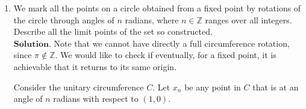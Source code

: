 \documentclass{article}
\theoremstyle{remark}
\begin{document}
\begin{enumerate}
        To find the magnitude of the absolute error, since $x_n - \sqrt{a} = \Delta_n$, then 
        $x_n = \Delta_n + \sqrt{a}$.
        This implies that 
        \[
        x_{n+1} = \Delta_{n+1} + \sqrt{a}= \frac{1}{2}\left((\Delta_n + \sqrt{a}) + \frac{a}{\Delta_n + \sqrt{a}}\right)
        \]
        thus 
        \[
        \Delta_{n+1} = \frac{1}{2}\left((\Delta_n + \sqrt{a}) + \frac{a}{\Delta_n + \sqrt{a}}\right) - \sqrt{a}
        \]
        operating the right hand side, we get
        \[
        \Delta_{n+1} = \frac{1}{2}\left(\frac{\Delta_n^2 + 2\Delta_n\sqrt{a} + 2a}{\Delta_n + \sqrt{a}}\right) - \sqrt{a}
        \]
        therefore 
        \[
        \Delta_{n+1} = \frac{\Delta_n^2 + 2\Delta_n\sqrt{a} + 2a-2\sqrt{a}\Delta_n-2a}{2(\Delta_n + \sqrt{a})} = \frac{\Delta_n^2}{2(\Delta_n + \sqrt{a})}
        \]
        we conclude that 
        \[
        \Delta_{n+1} = \frac{\Delta_n^2}{2x_n}.  
        \]
        This implies that the error for any subsequent term is quadratic, 
        although, since $x_n$ converges to $\sqrt{a}$, $(x_n - \sqrt{a})^2 < 1$ for some $n \geq N'$, 
        and from there on, the error will decrease ``faster''. %
        \begin{flushright}
            \qed
        \end{flushright}

        \item We mark all the points on a circle obtained from a fixed point by rotations of the circle through angles of \( n \) radians, 
        where \( n \in \mathbb{Z} \) ranges over all integers. 
        Describe all the limit points of the set so constructed.
        \\$\textbf{Solution.}$
        Note that we cannot have directly a full circumference rotation, since $\pi \notin \mathbb{Z}$.
        We would like to check if eventually, for a fixed point, it is achievable that it returns to its same origin.

        Consider the unitary circumference $C$. Let $x_n$ be any point in $C$ that is at an angle of $n$ radians with respect to $(1,0)$.
        

    \end{enumerate}
\end{document}
